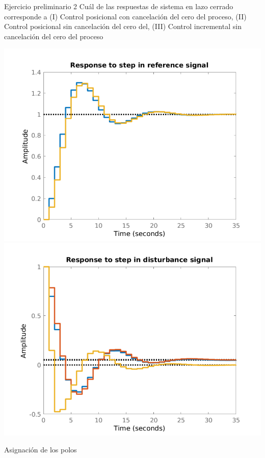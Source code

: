\documentclass[presentation,aspectratio=169]{beamer}
\begin{document}
\begin{frame}[label={sec:org6ae4e2c}]{Ejercicio preliminario 2}
Cuál de las respuestas de sistema en lazo cerrado corresponde a (I) Control posicional \alert{con} cancelación del cero del proceso,  (II) Control posicional \alert{sin} cancelación del cero del, (III) Control \alert{incremental} sin cancelación del cero del proceso
\begin{center}
\includegraphics[width=0.45\linewidth]{../../figures/aw5_3_refstep}
\includegraphics[width=0.45\linewidth]{../../figures/aw5_3_diststep}
\end{center}
\end{frame}

\begin{frame}[label={sec:org1bc8b80}]{Asignación de los polos}
\end{frame}
\end{document}
